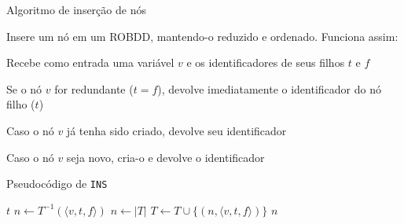 \expandafter\documentclass\expandafter[table, usenames, svgnames, dvipsnames,14pt, \classopts]{beamer}
\begin{document}
\begin{frame}{Algoritmo de inserção de nós}

    Insere um nó em um ROBDD, mantendo-o reduzido e ordenado. Funciona assim:

    \small
    \begin{outline}
        \1 Recebe como entrada uma variável $v$ e os identificadores de seus filhos $t$ e $f$

        \vspace{0.5em}

        \1 Se o nó $v$ for redundante ($t = f$), devolve imediatamente o identificador do nó filho ($t$)

        \vspace{0.5em}
        
        \1 Caso o nó $v$ já tenha sido criado, devolve seu identificador
        
        \vspace{0.5em}
        
        \1 Caso o nó $v$ seja novo, cria-o e devolve o identificador
    \end{outline}

\end{frame}

\begin{frame}{Pseudocódigo de \texttt{INS}}
    \scriptsize
    \begin{algorithm}[H]
        \begin{algorithmic}[1]
                    \State \Return $t$
                \EndIf
                \State $n \gets T^{-1}(\langle v,t,f \rangle)$
                    \State $n \gets |T|$
                    \State $T \gets T \cup \{(n, \langle v, t, f \rangle)\}$
                \EndIf
                \State \Return $n$
            \EndFunction
        \end{algorithmic}
    \end{algorithm}
\end{frame}
\end{document}

